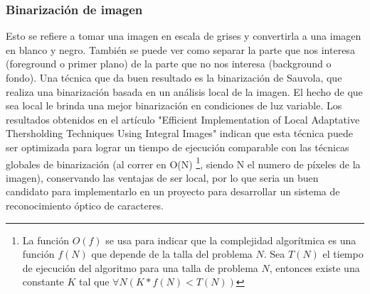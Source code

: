 \documentclass[a4paper, 11pt, oneside]{article}
\begin{document}
	\subsubsection{Binarización de imagen}
	Esto se refiere a tomar una imagen en escala de grises y convertirla a una 
	imagen en blanco y negro. También se puede ver como separar la parte que nos interesa
	(foreground o primer plano) de la parte que no nos interesa (background o fondo).
	Una técnica que da buen resultado es la binarización de Sauvola,
	que realiza una binarización basada en un análisis local de la imagen. El hecho de
	que sea local le brinda una mejor binarización en condiciones de luz variable. Los 
    resultados obtenidos en el artículo "Efficient Implementation of Local Adaptative 
    Thersholding Techniques Using Integral Images" indican que esta técnica puede ser
    optimizada para lograr un tiempo de ejecución comparable con las técnicas globales de 
    binarización (al correr en O(N) \footnote{La función $O(f)$ se usa para indicar que la complejidad
    algorítmica es una función $f(N)$ que depende de la talla del problema $N$. Sea $T(N)$ el tiempo de 
    ejecución del algoritmo para una talla de problema $N$, entonces existe una constante $K$ tal que 
    $\forall N ( K*f(N) < T(N) ) $}, siendo N el numero de píxeles de la imagen),
    conservando	las ventajas de ser local, por lo que seria un buen candidato para implementarlo en un 
    proyecto para desarrollar un sistema de reconocimiento óptico de caracteres.
	
\end{document}
